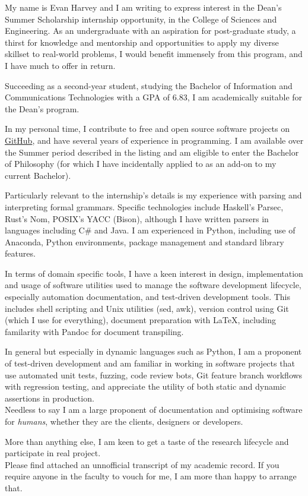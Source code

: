 \cvletter{}

\cvparagraph{}
{My name is Evan Harvey and I am writing to express interest in the Dean's Summer Scholarship internship opportunity, in the College of Sciences and Engineering.}
\cvparagraph{}
{As an undergraduate with an aspiration for post-graduate study, a thirst for knowledge and mentorship and opportunities to apply my diverse skillset to real-world problems, I would benefit immensely from this program, and I have much to offer in return.}
\cvparagraph{}
{Succeeding as a second-year student, studying the Bachelor of Information and Communications Technologies with a GPA of 6.83, I am academically suitable for the Dean's program.

\hspace{0.6cm} In my personal time, I contribute to free and open source software projects on \href{https://www.github.com/blinklad/}{GitHub}, and have several years of experience in programming. I am available over the Summer period described in the listing and am eligible to enter the Bachelor of Philosophy (for which I have incidentally applied to as an add-on to my current Bachelor).} 
\cvparagraph{}
{Particularly relevant to the internship's details is my experience with parsing and interpreting formal grammars. Specific technologies include Haskell's Parsec, Rust's Nom, POSIX's YACC (Bison), although I have written parsers in languages including C\# and Java. I am experienced in Python, including use of Anaconda, Python environments, package management and standard library features.}
\cvparagraph{}
{In terms of domain specific tools, I have a keen interest in design, implementation and usage of software utilities used to manage the software development lifecycle, especially automation documentation, and test-driven development tools.
 This includes shell scripting and Unix utilities (sed, awk), version control using Git (which I use for everything), document preparation with \LaTeX, including familarity with Pandoc for document transpiling.

\hspace{0.6cm} In general but especially in dynamic languages such as Python, I am a proponent of test-driven development and am familiar in working in software projects that use automated unit tests, fuzzing, code review bots, Git feature branch workflows with regression testing, and appreciate the utility of both static and dynamic assertions in production.\\
	Needless to say I am a large proponent of documentation and optimising software for \textit{humans}, whether they are the clients, designers or developers.}
\cvparagraph{}
  {More than anything else, I am keen to get a taste of the research lifecycle and participate in real project.\\
	  Please find attached an unnofficial transcript of my academic record. If you require anyone in the faculty to vouch for me, I am more than happy to arrange that.}
